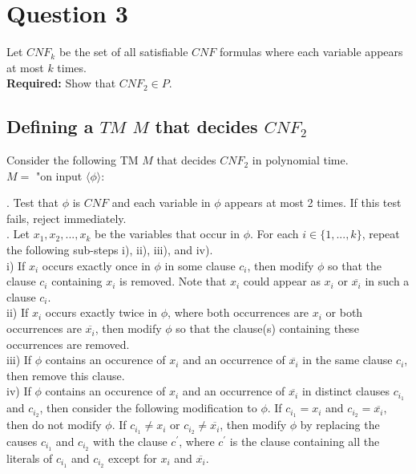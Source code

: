 \documentclass[12pt]{article}
\begin{document}
\newpage

\section*{Question 3}

Let $CNF_k$ be the set of all satisfiable $CNF$ formulas where each variable appears at most $k$ times. \\

\textbf{Required:} Show that $CNF_2 \in P$. 

\subsection*{Defining a $TM$ $M$ that decides $CNF_2$}

Consider the following TM $M$ that decides $CNF_2$ in polynomial time. \\

$M = $ "on input $\langle \phi \rangle$: \\

\setlength\parindent{15pt}

. Test that $\phi$ is $CNF$ and each variable in $\phi$ appears at most 2 times. If this test fails, reject immediately. \\

. Let $x_1,x_2,...,x_k$ be the variables that occur in $\phi$. For each $i \in \{1,...,k\}$, repeat the following sub-steps i), ii), iii), and iv). \\

i) If $x_i$ occurs exactly once in $\phi$ in some clause $c_i$, then modify $\phi$ so that the clause $c_i$ containing $x_i$ is removed. Note that $x_i$ could appear as $x_i$ or $\overline{x_i}$ in such a clause $c_i$. \\

ii) If $x_i$ occurs exactly twice in $\phi$, where both occurrences are $x_i$ or both occurrences are $\overline{x_i}$, then modify $\phi$ so that the clause(s) containing these occurrences are removed. \\

iii) If $\phi$ contains an occurence of $x_i$ and an occurrence of $\overline{x_i}$ in the same clause $c_i$, then remove this clause. \\

iv) If $\phi$ contains an occurence of $x_i$ and an occurrence of $\overline{x_i}$ in distinct clauses $c_{i_1}$ and $c_{i_2}$, then consider the following modification to $\phi$. If $c_{i_1} = x_i$ and $c_{i_2} = \overline{x_i}$, then do not modify $\phi$. If $c_{i_1} \neq x_i$ or $c_{i_2} \neq \overline{x_i}$, then modify $\phi$ by replacing the causes $c_{i_1}$ and $c_{i_2}$ with the clause $c^\prime$, where $c^\prime$ is the clause containing all the literals of $c_{i_1}$ and $c_{i_2}$ except for $x_i$ and $\overline{x_i}$. \\
\end{document}
